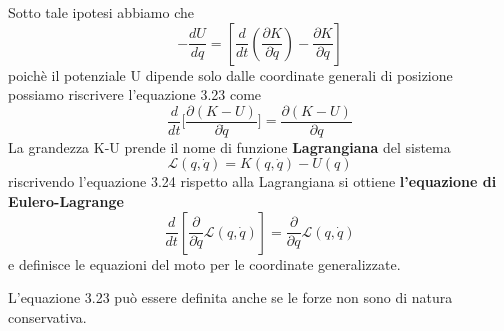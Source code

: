 \noindent Sotto tale ipotesi abbiamo che 
\begin{equation}
-\frac{d U}{d q} =\left[\frac{d}{d t}\left(\frac{\partial K}{\partial \dot{q}}\right)-\frac{\partial K}{\partial q}\right]
\end{equation}
poich\`{e} il potenziale U dipende solo dalle coordinate generali di posizione possiamo riscrivere l'equazione 3.23 come
\begin{equation}
\frac{d}{d t} \Big [\frac{\partial (K-U)}{\partial \dot{q}} \Big ]=\frac{\partial(K-U)}{\partial q}
\end{equation}
La grandezza K-U prende il nome di funzione \textbf{Lagrangiana} del sistema
\begin{equation}
	\mathcal{L}(q,\dot{q}) = K(q,\dot{q}) - U(q)
\end{equation}
riscrivendo l'equazione 3.24 rispetto alla Lagrangiana si ottiene \textbf{l'equazione di Eulero-Lagrange}
\setlength\fboxsep{0.15in}
\begin{equation}
\boxed{\frac{d}{d t}\left[\frac{\partial}{\partial \dot{q}} \mathcal{L}(q, \dot{q})\right]=\frac{\partial}{\partial q} \mathcal{L}(q, \dot{q})}
\end{equation}
e definisce le equazioni del moto per le coordinate generalizzate.
\begin{remark}
L'equazione 3.23 pu\`{o} essere definita anche se le forze non sono di natura conservativa.	
\end{remark}

